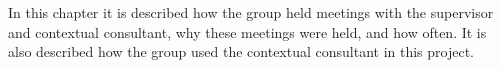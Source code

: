 In this chapter it is described how the group held meetings with the supervisor and contextual consultant, why these meetings were held, and how often. It is also described how the group used the contextual consultant in this project.